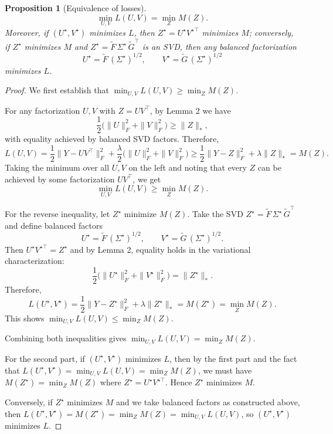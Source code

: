 \documentclass[11pt]{article}
\theoremstyle{spaced}
\newtheorem{proposition}{Proposition}
\begin{document}
\begin{proposition}[Equivalence of losses]
\[
\min_{U,V} L(U,V)
= \min_Z M(Z).
\]
Moreover, if \((U^\star,V^\star)\) minimizes \(L\), then \(Z^\star = U^\star V^{\star\top}\) minimizes \(M\); conversely, if \(Z^\star\) minimizes \(M\) and \(Z^\star = \tilde F\,\Sigma^\star\,\tilde G^\top\) is an SVD, then any balanced factorization
\[
U^\star = \tilde F\,(\Sigma^\star)^{1/2},
\qquad
V^\star = \tilde G\,(\Sigma^\star)^{1/2}
\]
minimizes \(L\).
\end{proposition}

\begin{proof}
We first establish that \(\min_{U,V} L(U,V) \ge \min_Z M(Z)\). 

For any factorization \(U, V\) with \(Z = UV^\top\), by Lemma 2 we have
\[
\frac{1}{2}\big(\|U\|_F^2 + \|V\|_F^2\big) \ge \|Z\|_*,
\]
with equality achieved by balanced SVD factors. Therefore,
\[
L(U,V) = \frac{1}{2}\|Y - UV^\top\|_F^2 + \frac{\lambda}{2}\big(\|U\|_F^2 + \|V\|_F^2\big)
\ge \frac{1}{2}\|Y - Z\|_F^2 + \lambda\|Z\|_* = M(Z).
\]
Taking the minimum over all \(U, V\) on the left and noting that every \(Z\) can be achieved by some factorization \(UV^\top\), we get 
\[\min_{U,V} L(U,V) \ge \min_Z M(Z).\]

For the reverse inequality, let \(Z^\star\) minimize \(M(Z)\). Take the SVD \(Z^\star = \tilde F\,\Sigma^\star\,\tilde G^\top\) and define balanced factors
\[
U^\star = \tilde F\,(\Sigma^\star)^{1/2}, \qquad V^\star = \tilde G\,(\Sigma^\star)^{1/2}.
\]
Then \(U^\star V^{\star\top} = Z^\star\) and by Lemma 2, equality holds in the variational characterization:
\[
\frac{1}{2}\big(\|U^\star\|_F^2 + \|V^\star\|_F^2\big) = \|Z^\star\|_*.
\]
Therefore,
\[
L(U^\star, V^\star) = \frac{1}{2}\|Y - Z^\star\|_F^2 + \lambda\|Z^\star\|_* = M(Z^\star) = \min_Z M(Z).
\]
This shows \(\min_{U,V} L(U,V) \le \min_Z M(Z)\).

Combining both inequalities gives \(\min_{U,V} L(U,V) = \min_Z M(Z)\).

For the second part, if \((U^\star, V^\star)\) minimizes \(L\), then by the first part and the fact that \(L(U^\star, V^\star) = \min_{U,V} L(U,V) = \min_Z M(Z)\), we must have \(M(Z^\star) = \min_Z M(Z)\) where \(Z^\star = U^\star V^{\star\top}\). Hence \(Z^\star\) minimizes \(M\).

Conversely, if \(Z^\star\) minimizes \(M\) and we take balanced factors as constructed above, then \(L(U^\star, V^\star) = M(Z^\star) = \min_Z M(Z) = \min_{U,V} L(U,V)\), so \((U^\star, V^\star)\) minimizes \(L\).
\end{proof}
\end{document}
